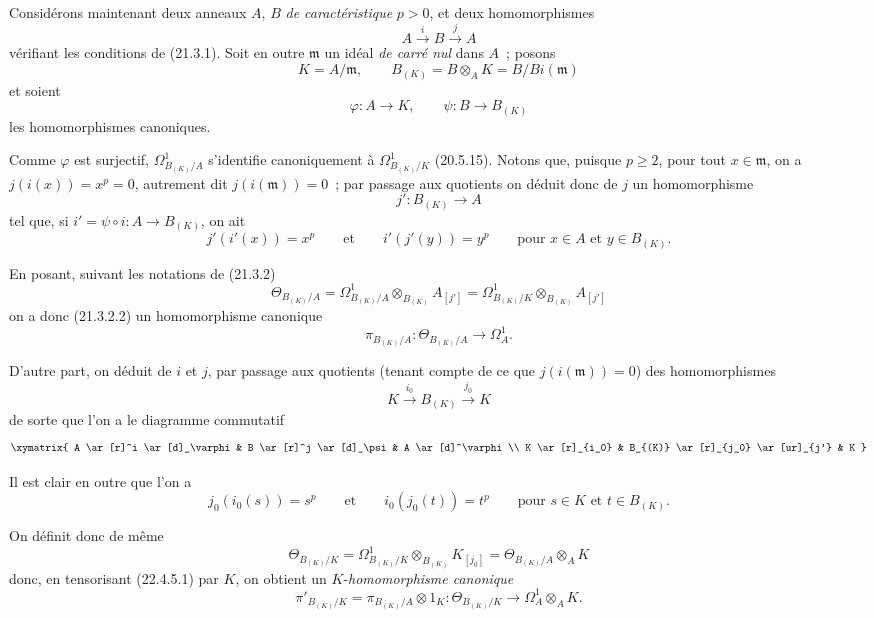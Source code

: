 \begin{env}[22.4.5]
\label{0.22.4.5-fr}
Considérons maintenant deux anneaux $A$, $B$ \emph{de caractéristique} $p>0$, et
deux homomorphismes
\[
  A\xrightarrow{i}B\xrightarrow{j}A
\]
vérifiant les conditions de (21.3.1). Soit en outre $\mathfrak m$ un idéal
\emph{de carré nul} dans $A$~; posons
\[
  K=A/\mathfrak m,\qquad
  B_{(K)}=B\otimes_AK=B/Bi(\mathfrak m)
\]
et soient
\[
  \varphi:A\longrightarrow K,\qquad
  \psi:B\longrightarrow B_{(K)}
\]
les homomorphismes canoniques.

Comme $\varphi$ est surjectif, $\Omega^1_{B_{(K)}/A}$ s'identifie
canoniquement à $\Omega^1_{B_{(K)}/K}$ (20.5.15). Notons que, puisque
$p\geqslant2$, pour tout $x\in\mathfrak m$, on a $j(i(x))=x^p=0$, autrement
dit $j(i(\mathfrak m))=0$~; par passage aux quotients on déduit donc de $j$ un
homomorphisme
\[
  j':B_{(K)}\longrightarrow A
\]
tel que, si $i'=\psi\circ i:A\longrightarrow B_{(K)}$, on ait
\[
  j'(i'(x))=x^p\qquad\text{et}\qquad i'(j'(y))=y^p
  \qquad\text{pour }x\in A\text{ et }y\in B_{(K)}.
\]

En posant, suivant les notations de (21.3.2)
\[
  \Theta_{B_{(K)}/A}
  =\Omega^1_{B_{(K)}/A}\otimes_{B_{(K)}}A_{[j']}
  =\Omega^1_{B_{(K)}/K}\otimes_{B_{(K)}}A_{[j']}
\]
on a donc (21.3.2.2) un homomorphisme canonique
\begin{equation}
\label{0.22.4.5.1-fr}
  \pi_{B_{(K)}/A}:\Theta_{B_{(K)}/A}\longrightarrow\Omega^1_A.
  \tag{22.4.5.1}
\end{equation}

D'autre part, on déduit de $i$ et $j$, par passage aux quotients (tenant compte
de ce que $j(i(\mathfrak m))=0$) des homomorphismes
\[
  K\xrightarrow{i_0}B_{(K)}\xrightarrow{j_0}K
\]
de sorte que l'on a le diagramme commutatif
\[
  \xymatrix{
    A \ar[r]^i \ar[d]_\varphi & B \ar[r]^j \ar[d]_\psi & A \ar[d]^\varphi \\
    K \ar[r]_{i_0} & B_{(K)} \ar[r]_{j_0} \ar[ur]_{j'} & K
  }
\]

Il est clair en outre que l'on a
\[
  j_0(i_0(s))=s^p\qquad\text{et}\qquad i_0(j_0(t))=t^p
  \qquad\text{pour }s\in K\text{ et }t\in B_{(K)}.
\]

On définit donc de même
\[
  \Theta_{B_{(K)}/K}
  =\Omega^1_{B_{(K)}/K}\otimes_{B_{(K)}}K_{[j_0]}
  =\Theta_{B_{(K)}/A}\otimes_AK
\]
donc, en tensorisant (22.4.5.1) par $K$, on obtient un
$K$-\emph{homomorphisme canonique}
\begin{equation}
\label{0.22.4.5.2-fr}
  \pi'_{B_{(K)}/K}=\pi_{B_{(K)}/A}\otimes1_K:
  \Theta_{B_{(K)}/K}\longrightarrow\Omega^1_A\otimes_AK.
  \tag{22.4.5.2}
\end{equation}


\end{env}
